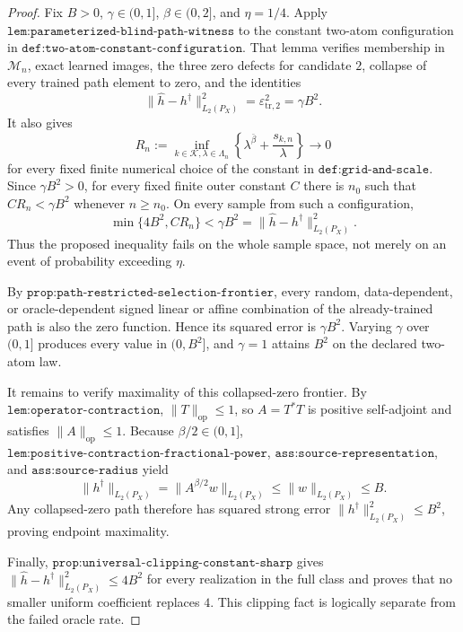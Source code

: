 \begin{proof}
Fix \(B>0\), \(\gamma\in(0,1]\), \(\beta\in(0,2]\), and \(\eta=1/4\). Apply \(\texttt{lem:parameterized-blind-path-witness}\) to the constant two-atom configuration in \(\texttt{def:two-atom-constant-configuration}\). That lemma verifies membership in \(\mathcal M_n\), exact learned images, the three zero defects for candidate \(2\), collapse of every trained path element to zero, and the identities
\[
 \|\widehat h-h^\dagger\|_{L_2(P_X)}^2
 =\varepsilon_{\mathrm{tr},2}^2
 =\gamma B^2.
\]
It also gives
\[
 R_n:=\inf_{k\in\mathcal K,\lambda\in\Lambda_n}
 \left\{\lambda^{\bar\beta}+\frac{s_{k,n}}{\lambda}\right\}
 \longrightarrow0
\]
for every fixed finite numerical choice of the constant in \(\texttt{def:grid-and-scale}\). Since \(\gamma B^2>0\), for every fixed finite outer constant \(C\) there is \(n_0\) such that \(CR_n<\gamma B^2\) whenever \(n\ge n_0\). On every sample from such a configuration,
\[
 \min\{4B^2,CR_n\}<\gamma B^2
 =\|\widehat h-h^\dagger\|_{L_2(P_X)}^2.
\]
Thus the proposed inequality fails on the whole sample space, not merely on an event of probability exceeding \(\eta\).

By \(\texttt{prop:path-restricted-selection-frontier}\), every random, data-dependent, or oracle-dependent signed linear or affine combination of the already-trained path is also the zero function. Hence its squared error is \(\gamma B^2\). Varying \(\gamma\) over \((0,1]\) produces every value in \((0,B^2]\), and \(\gamma=1\) attains \(B^2\) on the declared two-atom law.

It remains to verify maximality of this collapsed-zero frontier. By \(\texttt{lem:operator-contraction}\), \(\|T\|_{\mathrm{op}}\le1\), so \(A=T^*T\) is positive self-adjoint and satisfies \(\|A\|_{\mathrm{op}}\le1\). Because \(\beta/2\in(0,1]\), \(\texttt{lem:positive-contraction-fractional-power}\), \(\texttt{ass:source-representation}\), and \(\texttt{ass:source-radius}\) yield
\[
 \|h^\dagger\|_{L_2(P_X)}
 =\|A^{\beta/2}w\|_{L_2(P_X)}
 \le\|w\|_{L_2(P_X)}
 \le B.
\]
Any collapsed-zero path therefore has squared strong error \(\|h^\dagger\|_{L_2(P_X)}^2\le B^2\), proving endpoint maximality.

Finally, \(\texttt{prop:universal-clipping-constant-sharp}\) gives \(\|\widehat h-h^\dagger\|_{L_2(P_X)}^2\le4B^2\) for every realization in the full class and proves that no smaller uniform coefficient replaces \(4\). This clipping fact is logically separate from the failed oracle rate.
\end{proof}